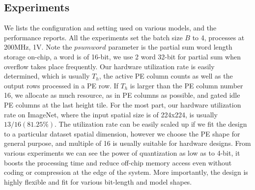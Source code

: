 \subsection{Experiments} 
We lists the configuration and setting used on various models, and the performance reports. All the experiments set the batch size $B$ to 4, processes at 200MHz, 1V. Note the $psum word$ parameter is the partial sum word length storage on-chip, a word is of 16-bit, we use 2 word 32-bit for partial sum when overflow takes place frequently. Our hardware utilization rate is easily determined, which is usually $T_h$, the active PE column counts as well as the output rows processed in a PE row. If $T_h$ is larger than the PE column number 16, we allocate as much resource, as in PE columns as possible, and gated idle PE columns at the last height tile. For the most part, our hardware utilization rate on ImageNet, where the input spatial size is of 224x224, is usually $13/16(81.25\%)$. The utilization rate can be easily scaled up if we fit the design to a particular dataset spatial dimension, however we choose the PE shape for general purpose, and multiple of 16 is usually suitable for hardware designs. From various experiments we can see the power of quantization as low as to 4-bit, it boosts the processing time and reduce off-chip memory access even without coding or compression at the edge of the system. More importantly, the design is highly flexible and fit for various bit-length and model shapes. \\

